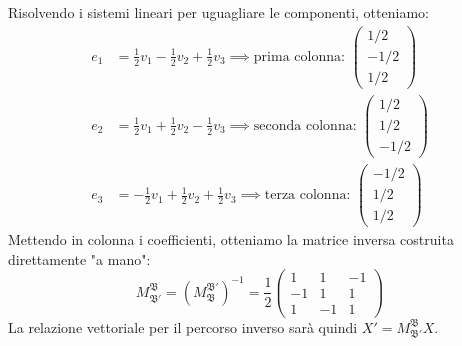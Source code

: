 \begin{richiamo}
        Risolvendo i sistemi lineari per uguagliare le componenti, otteniamo:
        \begin{align*}
        e_1 &= \frac{1}{2}v_1 - \frac{1}{2}v_2 + \frac{1}{2}v_3 \implies \text{prima colonna: } \begin{pmatrix} 1/2 \\ -1/2 \\ 1/2 \end{pmatrix} \\
        e_2 &= \frac{1}{2}v_1 + \frac{1}{2}v_2 - \frac{1}{2}v_3 \implies \text{seconda colonna: } \begin{pmatrix} 1/2 \\ 1/2 \\ -1/2 \end{pmatrix} \\
        e_3 &= -\frac{1}{2}v_1 + \frac{1}{2}v_2 + \frac{1}{2}v_3 \implies \text{terza colonna: } \begin{pmatrix} -1/2 \\ 1/2 \\ 1/2 \end{pmatrix}
        \end{align*}
        Mettendo in colonna i coefficienti, otteniamo la matrice inversa costruita direttamente "a mano":
        \[
        M_{\mathfrak{B}'}^{\mathfrak{B}} = (M_{\mathfrak{B}}^{\mathfrak{B}'})^{-1} = \frac{1}{2} \begin{pmatrix} 
        1 & 1 & -1 \\ 
        -1 & 1 & 1 \\ 
        1 & -1 & 1 
        \end{pmatrix}
        \]
        La relazione vettoriale per il percorso inverso sarà quindi $X' = M_{\mathfrak{B}'}^{\mathfrak{B}} X$.
        \end{richiamo}
        \newpage
